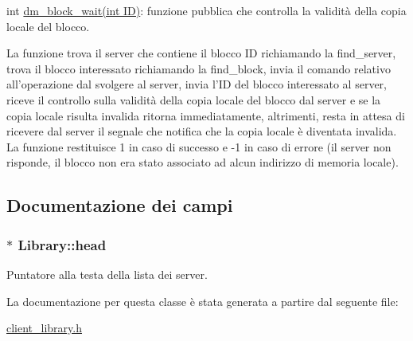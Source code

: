 int \hyperlink{classLibrary_467dc5e619aeb35ac8d5ac78b48dd450_467dc5e619aeb35ac8d5ac78b48dd450}{dm\_\-block\_\-wait(int ID)}: funzione pubblica che controlla la validità della copia locale del blocco. 

La funzione trova il server che contiene il blocco ID richiamando la find\_\-server, trova il blocco interessato richiamando la find\_\-block, invia il comando relativo all'operazione dal svolgere al server, invia l'ID del blocco interessato al server, riceve il controllo sulla validità della copia locale del blocco dal server e se la copia locale risulta invalida ritorna immediatamente, altrimenti, resta in attesa di ricevere dal server il segnale che notifica che la copia locale è diventata invalida. La funzione restituisce 1 in caso di successo e -1 in caso di errore (il server non risponde, il blocco non era stato associato ad alcun indirizzo di memoria locale). 

\subsection{Documentazione dei campi}
\hypertarget{classLibrary_eced31f89cfa5a81b832dddfe84c43f7_eced31f89cfa5a81b832dddfe84c43f7}{
\subsubsection[{head}]{$\ast$ {\bf Library::head}}}
\label{classLibrary_eced31f89cfa5a81b832dddfe84c43f7_eced31f89cfa5a81b832dddfe84c43f7}


Puntatore alla testa della lista dei server. 



La documentazione per questa classe è stata generata a partire dal seguente file:\begin{CompactItemize}
\item 
\hyperlink{client__library_8h}{client\_\-library.h}\end{CompactItemize}
